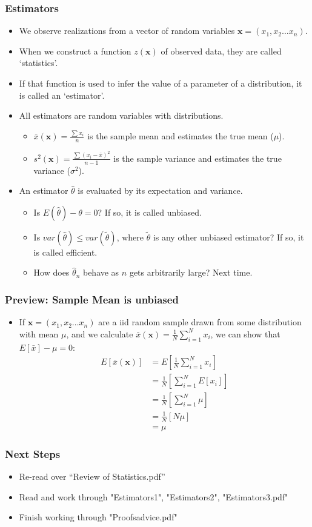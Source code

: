 \documentclass[aspectratio=169, handout]{beamer}
\numberwithin{equation}{section}
\begin{document}
\begin{frame}
\frametitle{Estimators}
\begin{itemize}
\item We observe realizations from a vector of random variables $\boldsymbol{x}=(x_1, x_2 \ldots x_n)$. \pause
\item When we construct a function $z(\boldsymbol{x})$ of observed data, they are called `statistics'. \pause  
\item If that function is used to infer the value of a parameter of a distribution, it is called an `estimator'.\pause
\item All estimators are random variables with distributions.\pause
\begin{itemize}
\item $\bar{x}(\boldsymbol{x})=\frac{\sum x_i }{n}$ is the sample mean and estimates the true mean ($\mu$). \pause
\item $s^2(\boldsymbol{x})=\frac{\sum (x_i-\bar{x})^2 }{n-1}$ is the sample variance and estimates  the true variance ($\sigma^2$).\\ \pause
\end{itemize}
\item An estimator $\hat{\theta}$ is evaluated by its expectation and variance.
\begin{itemize}
\item Is $E(\hat{\theta})-\theta=0$?  If so, it is called unbiased.
\item Is $var(\hat{\theta})\leq var(\tilde{\theta})$, where $\tilde{\theta}$ is any other unbiased estimator?  If so, it is called efficient.
\item How does $\hat{\theta}_n$ behave as $n$ gets arbitrarily large? Next time. 
\end{itemize}
\end{itemize}
\end{frame}

\begin{frame}
\frametitle{Preview: Sample Mean is unbiased}
\begin{itemize}
\item If $\boldsymbol{x}=(x_1, x_2 \ldots x_n)$ are a iid random sample drawn from some distribution with mean $\mu$, and we calculate $\bar{x}(\boldsymbol{x})=\frac{1}{N}\sum_{i=1}^N x_i$, we can show that $E[\bar{x}]-\mu=0$:
\begin{align*}
E[\bar{x}(\boldsymbol{x})]&=E[\frac{1}{N}\sum_{i=1}^N x_i]\\
&=\frac{1}{N}[\sum_{i=1}^N E[x_i]]\\
&=\frac{1}{N}[\sum_{i=1}^N \mu]\\
&=\frac{1}{N}[N \mu]\\
&=\mu
\end{align*}
\end{itemize}
\end{frame}



\begin{frame}
\frametitle{Next Steps}
\begin{itemize}
\item Re-read over ``Review of Statistics.pdf''
\item Read and work through "Estimators1", "Estimators2", "Estimators3.pdf"
\item Finish working through "Proofsadvice.pdf"
\end{itemize}
\end{frame}
\end{document}
